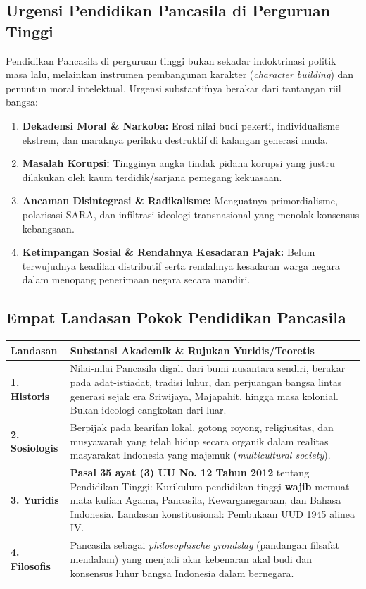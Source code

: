 \documentclass[10pt,a4paper]{article}
\begin{document}
\subsection{Urgensi Pendidikan Pancasila di Perguruan Tinggi}
Pendidikan Pancasila di perguruan tinggi bukan sekadar indoktrinasi politik masa lalu, melainkan instrumen pembangunan karakter (\textit{character building}) dan penuntun moral intelektual. Urgensi substantifnya berakar dari tantangan riil bangsa:
\begin{enumerate}
  \item \textbf{Dekadensi Moral \& Narkoba:} Erosi nilai budi pekerti, individualisme ekstrem, dan maraknya perilaku destruktif di kalangan generasi muda.
  \item \textbf{Masalah Korupsi:} Tingginya angka tindak pidana korupsi yang justru dilakukan oleh kaum terdidik/sarjana pemegang kekuasaan.
  \item \textbf{Ancaman Disintegrasi \& Radikalisme:} Menguatnya primordialisme, polarisasi SARA, dan infiltrasi ideologi transnasional yang menolak konsensus kebangsaan.
  \item \textbf{Ketimpangan Sosial \& Rendahnya Kesadaran Pajak:} Belum terwujudnya keadilan distributif serta rendahnya kesadaran warga negara dalam menopang penerimaan negara secara mandiri.
\end{enumerate}

\subsection{Empat Landasan Pokok Pendidikan Pancasila}
\begin{tabularx}{\linewidth}{lX}
  \toprule
  \textbf{Landasan} & \textbf{Substansi Akademik \& Rujukan Yuridis/Teoretis} \\
  \midrule
  \textbf{1. Historis} & Nilai-nilai Pancasila digali dari bumi nusantara sendiri, berakar pada adat-istiadat, tradisi luhur, dan perjuangan bangsa lintas generasi sejak era Sriwijaya, Majapahit, hingga masa kolonial. Bukan ideologi cangkokan dari luar. \\
  \textbf{2. Sosiologis} & Berpijak pada kearifan lokal, gotong royong, religiusitas, dan musyawarah yang telah hidup secara organik dalam realitas masyarakat Indonesia yang majemuk (\textit{multicultural society}). \\
  \textbf{3. Yuridis} & \textbf{Pasal 35 ayat (3) UU No. 12 Tahun 2012} tentang Pendidikan Tinggi: Kurikulum pendidikan tinggi \textbf{wajib} memuat mata kuliah Agama, Pancasila, Kewarganegaraan, dan Bahasa Indonesia. Landasan konstitusional: Pembukaan UUD 1945 alinea IV. \\
  \textbf{4. Filosofis} & Pancasila sebagai \textit{philosophische grondslag} (pandangan filsafat mendalam) yang menjadi akar kebenaran akal budi dan konsensus luhur bangsa Indonesia dalam bernegara. \\
  \bottomrule
\end{tabularx}
\end{document}
